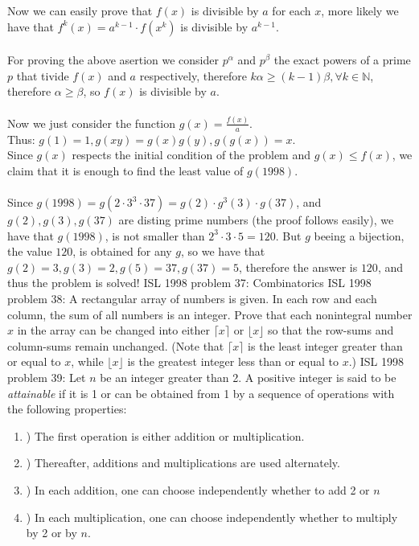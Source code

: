 Now we can easily prove that $f(x)$ is divisible by $a$ for each $x$, more likely we have that $f^k(x)=a^{k-1}\cdot f(x^k)$ is divisible by $a^{k-1}$. \\\\
For proving the above asertion we consider $p^{\alpha}$ and $p^{\beta}$ the exact powers of a prime $p$ that tivide $f(x)$ and $a$ respectively, therefore $k\alpha \geq (k-1)\beta , \forall k \in \mathbb{N}$, therefore $\alpha\geq \beta$, so $f(x)$ is divisible by $a$. \\\\
Now we just consider the function $g(x)=\frac{f(x)}{a}$. \\
Thus: $g(1)=1, g(xy)=g(x)g(y), g(g(x))=x$. \\
Since $g(x)$ respects the initial condition of the problem and $g(x)\leq f(x)$, we claim that it is enough to find the least value of $g(1998)$. \\\\
Since $g(1998)=g(2 \cdot 3^3\cdot 37) =g(2) \cdot g^3(3)\cdot g(37)$, and $g(2),g(3),g(37)$ are disting prime numbers (the proof follows easily), we have that $g(1998)$, is not smaller than $2^3\cdot 3 \cdot 5=120$. But $g$ beeing a bijection, the value $120$, is obtained for any $g$, so we have that $g(2)=3, g(3)=2, g(5)=37, g(37)=5$, therefore the answer is $120$, and thus the problem is solved! 
ISL 1998 problem 37:  Combinatorics 
ISL 1998 problem 38:  A rectangular array of numbers is given. In each row and each column, the sum of all numbers is an integer. Prove that each nonintegral number $x$ in the array can be changed into either $\lceil x\rceil $ or $\lfloor x\rfloor $ so that the row-sums and column-sums remain unchanged. (Note that $\lceil x\rceil $ is the least integer greater than or equal to $x$, while $\lfloor x\rfloor $ is the greatest integer less than or equal to $x$.) 
ISL 1998 problem 39:  Let $n$ be an integer greater than 2. A positive integer is said to be \textit{attainable }if it is 1 or can be obtained from 1 by a sequence of operations with the following properties:
\begin{enumerate}
  \item )  The first operation is either addition or multiplication.
  \item ) Thereafter, additions and multiplications are used alternately.
  \item )  In each addition, one can choose independently whether to add 2 or $n$
  \item )  In each multiplication, one can choose independently whether to multiply by 2 or by $n$.
\end{enumerate}
